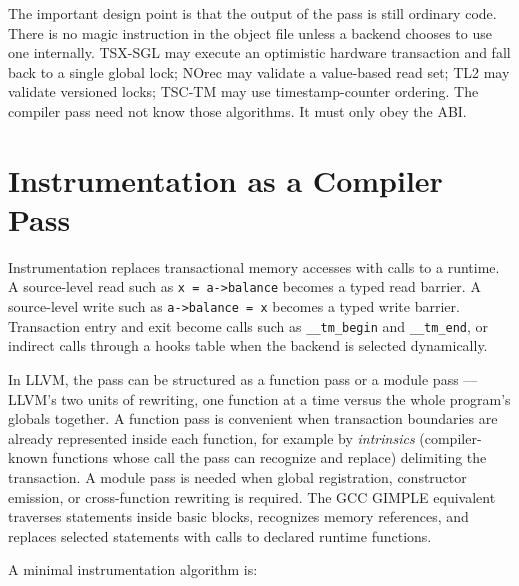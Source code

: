 The important design point is that the output of the pass is still ordinary code. There is no magic instruction in the object file unless a backend chooses to use one internally. TSX-SGL may execute an optimistic hardware transaction and fall back to a single global lock; NOrec may validate a value-based read set; TL2 may validate versioned locks; TSC-TM may use timestamp-counter ordering. The compiler pass need not know those algorithms. It must only obey the ABI.

\section{Instrumentation as a Compiler Pass}

Instrumentation replaces transactional memory accesses with calls to a runtime. A source-level read such as \texttt{x = a->balance} becomes a typed read barrier. A source-level write such as \texttt{a->balance = x} becomes a typed write barrier. Transaction entry and exit become calls such as \texttt{\_\_tm\_begin} and \texttt{\_\_tm\_end}, or indirect calls through a hooks table when the backend is selected dynamically.

In LLVM, the pass can be structured as a function pass or a module pass --- LLVM's two units of rewriting, one function at a time versus the whole program's globals together. A function pass is convenient when transaction boundaries are already represented inside each function, for example by \emph{intrinsics} (compiler-known functions whose call the pass can recognize and replace) delimiting the transaction. A module pass is needed when global registration, constructor emission, or cross-function rewriting is required. The GCC GIMPLE equivalent traverses statements inside basic blocks, recognizes memory references, and replaces selected statements with calls to declared runtime functions.

A minimal instrumentation algorithm is:


